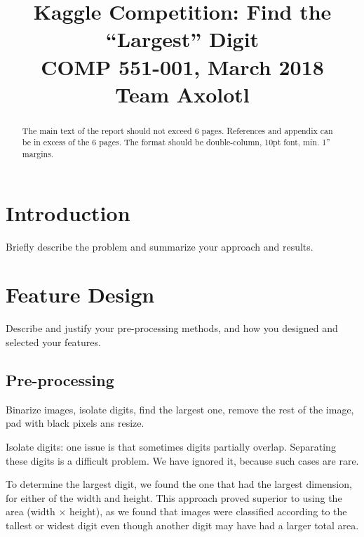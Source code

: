 \documentclass[conference]{IEEEtran}
\begin{document}
\title{Kaggle Competition: Find the ``Largest'' Digit\\
{\large COMP 551-001, March 2018\\}
{\Large Team Axolotl}
}

\author{
\and
{}
\and
{}
}

\maketitle

\begin{abstract}
The main text of the report should not exceed 6 pages. References and appendix can be in excess of the 6 pages. The format should be double-column, 10pt font, min. 1” margins.
\end{abstract}

\section{Introduction}

Briefly describe the problem and summarize your approach and results.


\section{Feature Design}

Describe and justify your pre-processing methods, and how you designed and selected your features.

\subsection{Pre-processing}

Binarize images, isolate digits, find the largest one, remove the rest of the image, pad with black pixels ans resize. 

Isolate digits: one issue is that sometimes digits partially overlap. Separating these digits is a difficult problem. We have ignored it, because such cases are rare. 

To determine the largest digit, we found the one that had the largest dimension, for either of the width and height. This approach proved superior to using the area (width $\times$ height), as we found that images were classified according to the tallest or widest digit even though another digit may have had a larger total area. 
\end{document}
